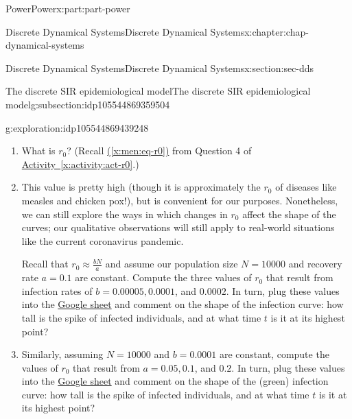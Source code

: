 \documentclass[oneside,10pt,]{book}
\newcommand{\xreffont}{\relax}
\numberwithin{equation}{section}
\begin{document}
\begin{partptx}{Power}{}{Power}{}{}{x:part:part-power}
\begin{chapterptx}{Discrete Dynamical Systems}{}{Discrete Dynamical Systems}{}{}{x:chapter:chap-dynamical-systems}
\begin{sectionptx}{Discrete Dynamical Systems}{}{Discrete Dynamical Systems}{}{}{x:section:sec-dds}
\begin{subsectionptx}{The discrete SIR epidemiological model}{}{The discrete SIR epidemiological model}{}{}{g:subsection:idp105544869359504}
\begin{exploration}{}{g:exploration:idp105544869439248}
%
\begin{enumerate}
\item{}What is \(r_0\)? (Recall \hyperref[x:men:eq-r0]{({\xreffont\ref{x:men:eq-r0}})} from Question 4 of \hyperref[x:activity:act-r0]{Activity~{\xreffont\ref{x:activity:act-r0}}}.)%
\item{}This value is pretty high (though it is approximately the \(r_0\) of diseases like measles and chicken pox!), but is convenient for our purposes. Nonetheless, we can still explore the ways in which changes in \(r_0\) affect the shape of the curves; our qualitative observations will still apply to real-world situations like the current coronavirus pandemic.%
\par
Recall that \(r_0 \approx \frac{bN}{a}\) and assume our population size \(N = 10000\) and recovery rate \(a = 0.1\) are constant. Compute the three values of \(r_0\) that result from infection rates of \(b = 0.00005, 0.0001\), and \(0.0002\). In turn, plug these values into the \href{https://drive.google.com/file/d/1xSJ6KM8x9HVdo9-P4QoUOoSmmfpKmmIQ/view?usp=sharing}{Google sheet}\footnotemark{} and comment on the shape of the infection curve: how tall is the spike of infected individuals, and at what time \(t\) is it at its highest point?%
\item{}Similarly, assuming \(N = 10000\) and \(b = 0.0001\) are constant, compute the values of \(r_0\) that result from \(a = 0.05, 0.1\), and \(0.2\). In turn, plug these values into the \href{https://drive.google.com/file/d/1xSJ6KM8x9HVdo9-P4QoUOoSmmfpKmmIQ/view?usp=sharing}{Google sheet}\footnotemark{} and comment on the shape of the (green) infection curve: how tall is the spike of infected individuals, and at what time \(t\) is it at its highest point?%
\end{enumerate}
\end{exploration}%
%
%
%
\end{subsectionptx}
\end{sectionptx}
\end{chapterptx}
%
\typeout{************************************************}

\end{partptx}
\end{document}

